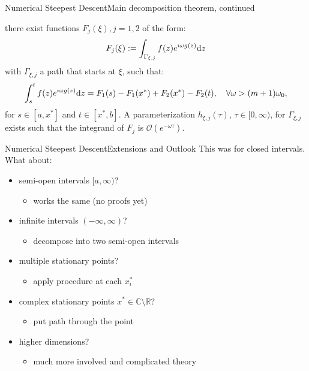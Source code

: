 \documentclass{beamer}
\begin{document}
\begin{frame}{Numerical Steepest Descent}{Main decomposition theorem, continued}
  \begin{theorem}
    there exist functions $F_j(\xi), j = 1, 2$ of the form:
    \begin{equation*}
      F_j(\xi) := \int_{\Gamma_{\xi,j}} f(z) e^{\imath \omega g(z)} \mathrm{d}z
    \end{equation*}
    with $\Gamma_{\xi,j}$ a path that starts at $\xi$, such that:
    \begin{equation*}
      \int_s^t f(z) e^{\imath \omega g(z)} \mathrm{d}z =
      F_1(s) - F_1(x^{*}) + F_2(x^{*}) - F_2(t), \quad \forall \omega > (m+1)\omega_0,
    \end{equation*}
    for $s \in [a, x^{*}]$ and $t \in [x^{*}, b]$. A parameterization
    $h_{\xi,j}(\tau)$, $\tau \in [0, \infty)$, for $\Gamma_{\xi,j}$ exists such that
    the integrand of $F_{j}$ is $\mathcal{O}(e^{−\omega \tau})$.
  \end{theorem}
\end{frame}


\begin{frame}{Numerical Steepest Descent}{Extensions and Outlook}
  This was for closed intervals. What about:
  \vspace{0.2cm}
  \begin{itemize}
    \item semi-open intervals $[a, \infty)$?
    \begin{itemize}
      \item works the same (no proofs yet)
    \end{itemize}
    \item infinite intervals $(-\infty, \infty)$?
    \begin{itemize}
      \item decompose into two semi-open intervals
    \end{itemize}
    \item multiple stationary points?
    \begin{itemize}
      \item apply procedure at each $x^{*}_i$
    \end{itemize}
    \item complex stationary points $x^{*} \in \mathbb{C} \setminus \mathbb{R}$?
    \begin{itemize}
      \item put path through the point
    \end{itemize}
    \item higher dimensions?
    \begin{itemize}
      \item much more involved and complicated theory
    \end{itemize}
  \end{itemize}
\end{frame}
\end{document}
